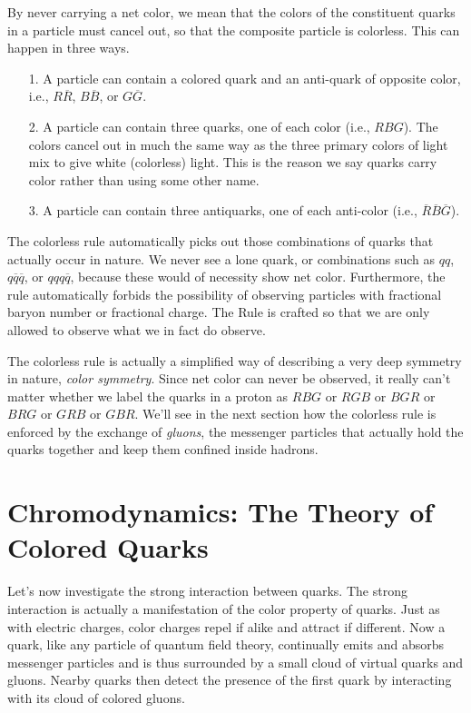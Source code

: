 
By never carrying a net color, we mean that the colors of the
constituent quarks in a particle must cancel out, so that the
composite particle is colorless.  This can happen in three ways.
\begin{itemize}
\item[1.] A particle can contain a colored quark and an anti-quark of
  opposite color, i.e., $R\overline R$, $B\overline B$, or $G\overline G$.
\item[2.] A particle can contain three quarks, one of each color
  (i.e., $RBG$).  The colors cancel out in much the same way as the
  three primary colors of light mix to give white (colorless) light.
  This is the reason we say quarks carry color rather than using some
  other name.
\item[3.] A particle can contain three antiquarks, one of each
  anti-color (i.e., $\overline R\overline B\overline G$).
\end{itemize}

The colorless rule automatically picks out those combinations of
quarks that actually occur in nature.  We never see a lone quark, or
combinations such as $qq$, $q\overline q\overline q$, or $qqq\overline
q$, because these would of necessity show net color.  Furthermore, the
rule automatically forbids the possibility of observing particles with
fractional baryon number or fractional charge.  The Rule is crafted so
that we are only allowed to observe what we in fact do observe.

The colorless rule is actually a simplified way of describing a very
deep symmetry in nature, {\em color symmetry}.  Since net color can
never be observed, it really can't matter whether we label the quarks
in a proton as $RBG$ or $RGB$ or $BGR$ or $BRG$ or $GRB$ or $GBR$.
We'll see in the next section how the colorless rule is enforced by
the exchange of {\em gluons}, the messenger particles that actually
hold the quarks together and keep them confined inside hadrons.

\section[Chromodynamics]{Chromodynamics: The Theory of Colored Quarks}

Let's now investigate the strong interaction between quarks.  The
strong interaction is actually a manifestation of the color property
of quarks. Just as with electric charges, color charges repel if alike
and attract if different.  Now a quark, like any particle of quantum
field theory, continually emits and absorbs messenger particles and is
thus surrounded by a small cloud of virtual quarks and gluons. Nearby
quarks then detect the presence of the first quark by interacting with
its cloud of colored gluons.


